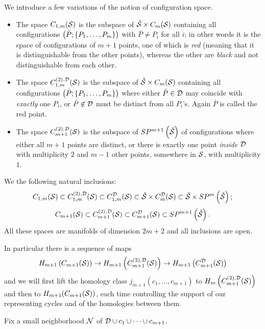 \begin{defn}
\label{defn:variationsCm}
We introduce a few variations of the notion of configuration space.
\begin{itemize} 
 \item The space $C_{1,m}(\S)$ is the subspace of $\mrS\times \cms$ containing all configurations
 $\pa{\bar P;\set{P_1,\dots,P_m}}$ with $\bar P\neq P_i$ for all $i$; in other words it is
 the space of configurations of $m+1$ points, one of which is \emph{red} (meaning that
 it is distinguishable from the other points), whereas the other are \emph{black} and not distinguishable
 from each other.
 \item The space $\fmstwoD$ is the subspace of $\mrS\times\cms$ containing all configurations
 $\pa{\bar P;\set{P_1,\dots, P_m}}$ where either $\bar P\in\D$ may coincide with \emph{exactly}
 one $P_i$, or
 $\bar P\not\in \D$ must be distinct from all $P_i$'s.
 Again $\bar P$ is called the red point.
 \item The space $\cmstwoD$ is the subspace of $\SP^{m+1}\pa{\mrS}$ of configurations where either all $m+1$ points
 are distinct, or there is exactly one point \emph{inside $\D$} with multiplicity $2$ and $m-1$ other points,
 somewhere in $\S$, with multiplicity $1$.
\end{itemize}
 \end{defn}
 
We the following natural inclusions:
\[
C_{1,m}(\S)\subset\fmstwoD\subset\fmsD\subset\mrS\times\cmsD\subset\mrS\times\SP^m\pa{\mrS};
\]
\[
C_{m+1}(\S)\subset\cmstwoD\subset C_{m+1}^{\D}(\S)\subset\SP^{m+1}\pa{\mrS}.
\]
All these spaces are
manifolds of dimension $2m+2$ and all inclusions are open.

In particular there is a sequence of maps
\[
 H_{m+1}\pa{C_{m+1}(\S)}\to H_{m+1}\pa{\cmstwoD}\to H_{m+1}\pa{C_{m+1}^{\D}(\S)}
\]
and we will first lift the homology class $j_{m+1}(c_1,\dots,c_{m+1})$ to $H_m\pa{\cmstwoD}$ and
then to $H_{m+1}(C_{m+1}(\S))$, each time controlling the support of our representing
cycles and of the homologies between them.

Fix a small neighborhood $\N$ of $\D\cup c_1\cup\dots\cup c_{m+1}$.

